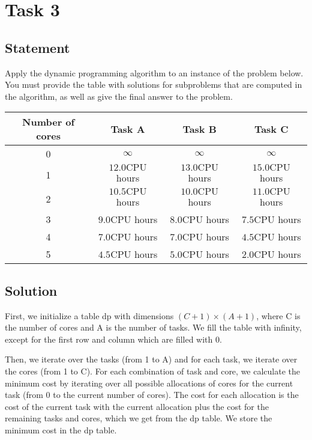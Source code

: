 \documentclass{article}
\begin{document}
\section{Task 3}
\subsection{Statement}
Apply the dynamic programming algorithm to an instance of the problem below. You must provide the table with solutions for subproblems that are computed in the algorithm, as well as give the final answer to the problem.

\begin{center}
    \begin{tabular}{|c||c|c|c|}
        \hline
        Number of cores & Task A & Task B & Task C \\
        \hline\hline
        0 & $\infty$ & $\infty$ & $\infty$ \\
        \hline
        1 & $12.0 \mathrm{CPU}$ hours & $13.0 \mathrm{CPU}$ hours & $15.0 \mathrm{CPU}$ hours \\
        \hline
        2 & $10.5 \mathrm{CPU}$ hours & $10.0 \mathrm{CPU}$ hours & $11.0 \mathrm{CPU}$ hours \\
        \hline
        3 & $9.0 \mathrm{CPU}$ hours & $8.0 \mathrm{CPU}$ hours & $7.5 \mathrm{CPU}$ hours \\
        \hline
        4 & $7.0 \mathrm{CPU}$ hours & $7.0 \mathrm{CPU}$ hours & $4.5 \mathrm{CPU}$ hours \\
        \hline
        5 & $4.5 \mathrm{CPU}$ hours & $5.0 \mathrm{CPU}$ hours & $2.0 \mathrm{CPU}$ hours \\
        \hline
    \end{tabular}
\end{center}

\subsection{Solution}

First, we initialize a table dp with dimensions $(C+1) \times (A+1)$, where C is the number of cores and A is the number of tasks. We fill the table with infinity, except for the first row and column which are filled with 0.

Then, we iterate over the tasks (from 1 to A) and for each task, we iterate over the cores (from 1 to C). For each combination of task and core, we calculate the minimum cost by iterating over all possible allocations of cores for the current task (from 0 to the current number of cores). The cost for each allocation is the cost of the current task with the current allocation plus the cost for the remaining tasks and cores, which we get from the dp table. We store the minimum cost in the dp table.
\end{document}
